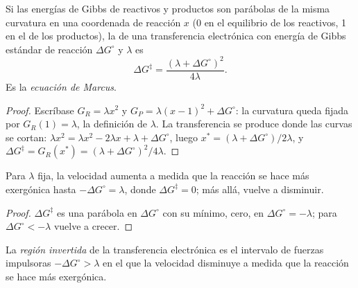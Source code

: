\begin{theorem}\label{thm:b3:complex-mechanisms:marcus}
Si las energías de Gibbs de reactivos y productos son parábolas de la misma
curvatura en una coordenada de reacción $x$ (0 en el equilibrio de los reactivos, 1 en el de los
productos), la  de una transferencia electrónica con
energía de Gibbs estándar de reacción $\Delta G^\circ$ y  $\lambda$ es
\[
  \Delta G^{\ddagger} = \frac{(\lambda + \Delta G^\circ)^2}{4\lambda} .
\]
Es la \emph{ecuación de Marcus}.
\end{theorem}

\begin{proof}
Escríbase $G_R = \lambda x^2$ y $G_P = \lambda(x - 1)^2 + \Delta G^\circ$: la curvatura queda fijada por $G_R(1) = \lambda$, la
definición de $\lambda$. La transferencia se produce donde las curvas se cortan: $\lambda x^2 = \lambda x^2 - 2\lambda x + \lambda +
\Delta G^\circ$, luego $x^\ast = (\lambda + \Delta G^\circ)/2\lambda$, y $\Delta G^{\ddagger} = G_R(x^\ast) = (\lambda + \Delta G^\circ)^2/4\lambda$.
\end{proof}

\begin{corollary}\label{cor:b3:complex-mechanisms:inverted}
Para $\lambda$ fija, la velocidad aumenta a medida que la reacción se hace más exergónica hasta
$-\Delta G^\circ = \lambda$, donde $\Delta G^{\ddagger} = 0$; más allá, vuelve a disminuir.
\end{corollary}

\begin{proof}
$\Delta G^{\ddagger}$ es una parábola en $\Delta G^\circ$ con su mínimo, cero, en $\Delta G^\circ = -\lambda$; para $\Delta G^\circ < -\lambda$ vuelve
a crecer.
\end{proof}

\begin{definition}\label{def:b3:complex-mechanisms:inverted}
La \emph{región invertida} de la transferencia electrónica es el
intervalo de fuerzas impulsoras $-\Delta G^\circ > \lambda$ en el que la velocidad disminuye a medida que la reacción se hace
más exergónica.
\end{definition}

